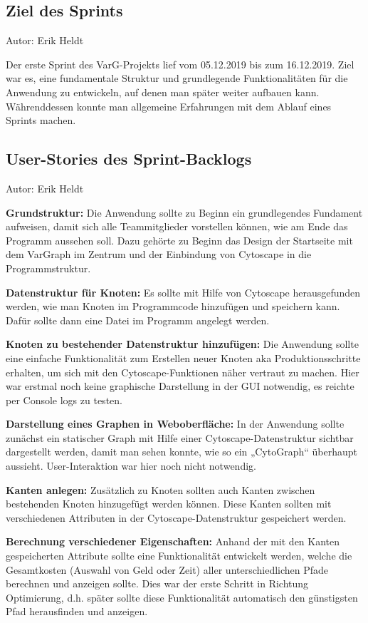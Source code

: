 \subsection{Ziel des Sprints}
{\small Autor: Erik Heldt}

Der erste Sprint des VarG-Projekts lief vom 05.12.2019 bis zum 16.12.2019. Ziel war es, eine fundamentale Struktur und grundlegende Funktionalitäten für die Anwendung zu entwickeln, auf denen man später weiter aufbauen kann. Währenddessen konnte man allgemeine Erfahrungen mit dem Ablauf eines Sprints machen.

\subsection{User-Stories des Sprint-Backlogs}
{\small Autor: Erik Heldt}

\textbf{Grundstruktur:}
Die Anwendung sollte zu Beginn ein grundlegendes Fundament aufweisen, damit sich alle Teammitglieder vorstellen können, wie am Ende das Programm aussehen soll. Dazu gehörte zu Beginn das Design der Startseite mit dem VarGraph im Zentrum und der Einbindung von Cytoscape in die Programmstruktur.

\textbf{Datenstruktur für Knoten:}
Es sollte mit Hilfe von Cytoscape herausgefunden werden, wie man Knoten im Programmcode hinzufügen und speichern kann. Dafür sollte dann eine Datei im Programm angelegt werden.

\textbf{Knoten zu bestehender Datenstruktur hinzufügen:}
Die Anwendung sollte eine einfache Funktionalität zum Erstellen neuer Knoten aka Produktionsschritte erhalten, um sich mit den Cytoscape-Funktionen näher vertraut zu machen. Hier war erstmal noch keine graphische Darstellung in der GUI notwendig, es reichte per Console logs zu testen.

\textbf{Darstellung eines Graphen in Weboberfläche:}
In der Anwendung sollte zunächst ein statischer Graph mit Hilfe einer Cytoscape-Datenstruktur sichtbar dargestellt werden, damit man sehen konnte, wie so ein „CytoGraph“ überhaupt aussieht. User-Interaktion war hier noch nicht notwendig.

\textbf{Kanten anlegen:}
Zusätzlich zu Knoten sollten auch Kanten zwischen bestehenden Knoten hinzugefügt werden können. Diese Kanten sollten mit verschiedenen Attributen in der Cytoscape-Datenstruktur gespeichert werden.

\textbf{Berechnung verschiedener Eigenschaften:}
Anhand der mit den Kanten gespeicherten Attribute sollte eine Funktionalität entwickelt werden, welche die Gesamtkosten (Auswahl von Geld oder Zeit) aller unterschiedlichen Pfade berechnen und anzeigen sollte. Dies war der erste Schritt in Richtung Optimierung, d.h. später sollte diese Funktionalität automatisch den günstigsten Pfad herausfinden und anzeigen.

